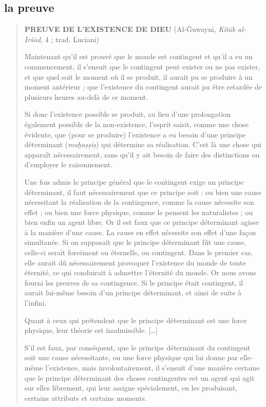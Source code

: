 \subsection{la preuve}
\begin{quote}
\textbf{PREUVE DE L'EXISTENCE DE DIEU} (Al-Ğuwaynī, \emph{Kitāb
al-Iršād}, 4 ; trad. Luciani)

Maintenant qu'il est prouvé que le monde est contingent et qu'il a eu un
commencement, il s'ensuit que le contingent peut exister ou ne pas
exister, et que quel soit le moment où il se produit, il aurait pu se
produire à un moment antérieur ; que l'existence du contingent aurait pu
être retardée de plusieurs heures au-delà de ce moment.

Si donc l'existence possible se produit, au lieu d'une prolongation
également possible de la non-existence, l'esprit saisit, comme une chose
évidente, que (pour se produire) l'existence a eu besoin d'une principe
déterminant (\emph{muḫaṣṣiṣ}) qui détermine sa réalisation. C'est là une
chose qui apparaît nécessairement, sans qu'il y ait besoin de faire des
distinctions ou d'employer le raisonnement.

Une fois admis le principe général que le contingent exige un principe
déterminant, il faut nécessairement que ce principe soit : ou bien une
cause nécessitant la réalisation de la contingence, comme la cause
nécessite son effet ; ou bien une force physique, comme le pensent les
naturalistes ; ou bien enfin un agent libre. Or il est faux que ce
principe déterminant agisse à la manière d'une cause. La cause en effet
nécessite son effet d'une façon simultanée. Si on supposait que le
principe déterminant fût une cause, celle-ci serait forcément ou
éternelle, ou contingent. Dans le premier cas, elle aurait dû
nécessairement provoquer l'existence du monde de toute éternité, ce qui
conduirait à admettre l'éternité du monde. Or nous avons fourni les
preuves de sa contingence. Si le principe était contingent, il aurait
lui-même besoin d'un principe déterminant, et ainsi de suite à l'infini.

Quant à ceux qui prétendent que le principe déterminant est une force
physique, leur théorie
est inadmissible. {[}\ldots{]}

S'il est faux, par conséquent, que le principe déterminant du contingent
soit une cause nécessitante, ou une force physique qui lui donne par
elle-même l'existence, mais involontairement, il s'ensuit d'une manière
certaine que le principe déterminant des choses
contingentes est un agent qui agit sur elles librement, qui leur assigne
spécialement, en les produisant, certains attributs et certains moments.
\end{quote}
 
